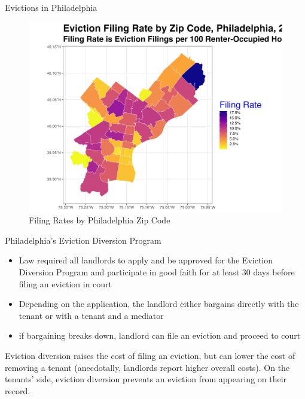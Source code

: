 \documentclass[10pt, xcolor=dvipsnames]{beamer}
\begin{document}
\begin{frame}{Evictions in Philadelphia}
    \begin{figure}
        \centering
        \includegraphics[width=0.75\linewidth]{figs/pa_zip_filing_rate_2019.png}
        \caption{Filing Rates by Philadelphia Zip Code}
        \label{fig:philly-zip}
    \end{figure}
\end{frame}


\begin{frame}{Philadelphia's Eviction Diversion Program}
    \begin{itemize}
        \item Law required all landlords to apply and be approved for the Eviction Diversion Program and participate in good faith for at least 30 days before filing an eviction in court
        \item Depending on the application, the landlord either bargains directly with the tenant or with a tenant and a mediator
        \item if bargaining breaks down, landlord can file an eviction and proceed to court
    \end{itemize}

    Eviction diversion raises the cost of filing an eviction, but can lower the cost of removing a tenant (anecdotally, landlords report higher overall costs). On the tenants' side, eviction diversion prevents an eviction from appearing on their record.
\end{frame}
\end{document}
